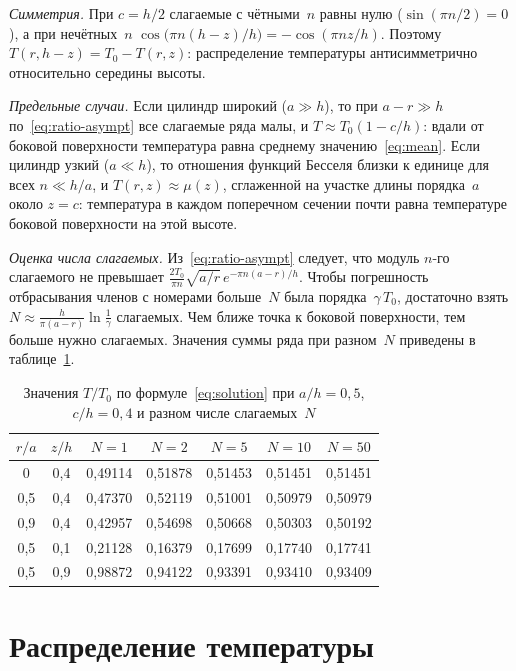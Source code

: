\emph{Симметрия.} При $c=h/2$ слагаемые с чётными~$n$ равны нулю
($\sin(\pi n/2)=0$), а при нечётных~$n$
$\cos\bigl(\pi n(h-z)/h\bigr)=-\cos(\pi nz/h)$. Поэтому
$T(r,h-z)=T_0-T(r,z)$: распределение температуры антисимметрично
относительно середины высоты.

\emph{Предельные случаи.} Если цилиндр широкий ($a\gg h$), то при
$a-r\gg h$ по~\eqref{eq:ratio-asympt} все слагаемые ряда малы, и
$T\approx T_0(1-c/h)$: вдали от боковой поверхности температура равна
среднему значению~\eqref{eq:mean}. Если цилиндр узкий ($a\ll h$), то
отношения функций Бесселя близки к единице для всех $n\ll h/a$, и
$T(r,z)\approx\mu(z)$, сглаженной на участке длины порядка~$a$ около
$z=c$: температура в каждом поперечном сечении почти равна температуре
боковой поверхности на этой высоте.

\emph{Оценка числа слагаемых.} Из~\eqref{eq:ratio-asympt} следует, что
модуль $n$-го слагаемого не превышает
$\frac{2T_0}{\pi n}\sqrt{a/r}\,e^{-\pi n(a-r)/h}$. Чтобы погрешность
отбрасывания членов с номерами больше~$N$ была порядка~$\gamma\,T_0$,
достаточно взять
$N\approx\frac{h}{\pi(a-r)}\ln\frac{1}{\gamma}$ слагаемых. Чем ближе
точка к боковой поверхности, тем больше нужно слагаемых. Значения суммы
ряда при разном~$N$ приведены в таблице~\ref{tab:conv}.

\begin{table}[H]
  \caption{Значения $T/T_0$ по формуле~\eqref{eq:solution} при
  $a/h=0{,}5$, $c/h=0{,}4$ и разном числе слагаемых~$N$}
  \label{tab:conv}
  \centering
  \begin{tabular}{|c|c|c|c|c|c|c|}
    \hline
    $r/a$ & $z/h$ & $N=1$ & $N=2$ & $N=5$ & $N=10$ & $N=50$\\
    \hline
    0     & 0,4 & 0,49114 & 0,51878 & 0,51453 & 0,51451 & 0,51451\\
    0,5   & 0,4 & 0,47370 & 0,52119 & 0,51001 & 0,50979 & 0,50979\\
    0,9   & 0,4 & 0,42957 & 0,54698 & 0,50668 & 0,50303 & 0,50192\\
    0,5   & 0,1 & 0,21128 & 0,16379 & 0,17699 & 0,17740 & 0,17741\\
    0,5   & 0,9 & 0,98872 & 0,94122 & 0,93391 & 0,93410 & 0,93409\\
    \hline
  \end{tabular}
\end{table}

\section{Распределение температуры}
\label{sec:picture}

